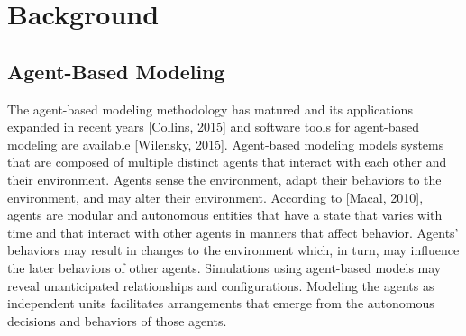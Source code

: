 
\section{Background}\label{sec:Background}

    \subsection{Agent-Based Modeling}\label{subsec:abm}
        The agent-based modeling methodology has matured and its applications expanded
        in recent years [Collins, 2015] and software tools for agent-based modeling
        are available [Wilensky, 2015].
        Agent-based modeling models systems that are composed of multiple distinct agents
        that interact with each other and their environment.
        Agents sense the environment, adapt their behaviors to the environment,
        and may alter their environment.
        According to [Macal, 2010], agents are modular and autonomous entities that have a
        state that varies with time and that interact with other agents in manners that
        affect behavior.
        Agents' behaviors may result in changes to the environment which, in turn, may
        influence the later behaviors of other agents.
        Simulations using agent-based models may reveal unanticipated relationships
        and configurations.
        Modeling the agents as independent units facilitates arrangements that emerge
        from the autonomous decisions and behaviors of those agents.

